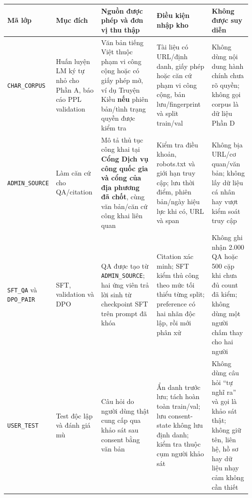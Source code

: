 \documentclass[11pt,a4paper]{article}
\begin{document}
{\def\LTcaptype{none} %
\begin{longtable}[]{@{}
  >{\raggedright\arraybackslash}p{}
  >{\raggedright\arraybackslash}p{}
  >{\raggedright\arraybackslash}p{}
  >{\raggedright\arraybackslash}p{}
  >{\raggedright\arraybackslash}p{}@{}}
\toprule\noalign{}
\begin{minipage}[b]{\linewidth}\raggedright
Mã lớp
\end{minipage} & \begin{minipage}[b]{\linewidth}\raggedright
Mục đích
\end{minipage} & \begin{minipage}[b]{\linewidth}\raggedright
Nguồn được phép và đơn vị thu thập
\end{minipage} & \begin{minipage}[b]{\linewidth}\raggedright
Điều kiện nhập kho
\end{minipage} & \begin{minipage}[b]{\linewidth}\raggedright
Không được suy diễn
\end{minipage} \\
\midrule\noalign{}
\endhead
\bottomrule\noalign{}
\endlastfoot
\nolinkurl{CHAR_CORPUS} & Huấn luyện LM ký tự nhỏ cho Phần A, báo cáo
PPL validation & Văn bản tiếng Việt thuộc phạm vi công cộng hoặc có giấy
phép mở, ví dụ Truyện Kiều \textbf{nếu} phiên bản/tình trạng quyền được
kiểm tra & Tài liệu có URL/định danh, giấy phép hoặc căn cứ phạm vi công
cộng, bản lưu/fingerprint và split train/val & Không dùng nội dung hành
chính chưa rõ quyền; không gọi corpus là dữ liệu Phần D \\
\nolinkurl{ADMIN_SOURCE} & Làm căn cứ cho QA/citation & Mô tả thủ tục
công khai tại \textbf{Cổng Dịch vụ công quốc gia và cổng của địa phương
đã chốt}, cùng văn bản/căn cứ công khai liên quan & Kiểm tra điều khoản,
robots.txt và giới hạn truy cập; lưu thời điểm, phiên bản/ngày hiệu lực
khi có, URL và span & Không bịa URL/cơ quan/văn bản; không lấy dữ liệu
cá nhân hay vượt kiểm soát truy cập \\
\nolinkurl{SFT_QA} và \nolinkurl{DPO_PAIR} & SFT, validation và DPO & QA
được tạo từ \nolinkurl{ADMIN_SOURCE}; hai ứng viên trả lời sinh từ
checkpoint SFT trên prompt đã khóa & Citation xác minh; SFT kiểm thủ
công theo mức tối thiểu từng split; preference có hai nhãn độc lập, rồi
mới phân xử & Không ghi nhận 2.000 QA hoặc 500 cặp khi chưa đủ count đã
kiểm; không dùng một người chấm thay cho hai người \\
\nolinkurl{USER_TEST} & Test độc lập và đánh giá mù & Câu hỏi do người
dùng thật cung cấp qua khảo sát sau consent bằng văn bản & Ẩn danh trước
lưu; tách hoàn toàn train/val; lưu consent-state không lưu định danh;
kiểm tra thuộc cụm người khảo sát & Không dùng câu hỏi ``tự nghĩ ra'' và
gọi là khảo sát thật; không giữ tên, liên hệ, hồ sơ hay dữ liệu nhạy cảm
không cần thiết \\
\end{longtable}
}
\end{document}
